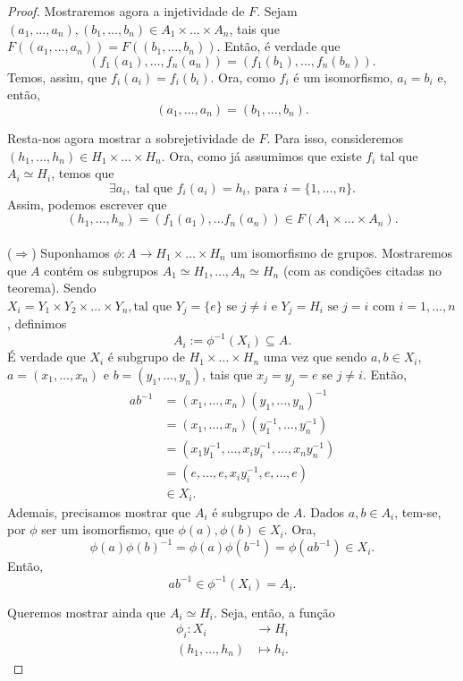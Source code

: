 \documentclass[11pt,openany]{book}
\begin{document}
\begin{proof}
        Mostraremos agora a injetividade de $F$. Sejam  $(a_1, \dots, a_n), (b_1, \dots, b_n) \in  A_1 \times \dots \times A_n$, tais que $F((a_1, \dots, a_n)) = F((b_1, \dots, b_n))$. Então, é verdade que
        \[(f_1(a_1), \dots, f_n(a_n)) = (f_1(b_1), \dots, f_n(b_n)).\]
        Temos, assim, que $f_i(a_i) = f_i(b_i)$. Ora, como $f_i$ é um isomorfismo, $a_i = b_i$ e, então,
        \[(a_1, \dots, a_n) = (b_1, \dots, b_n).\]

        Resta-nos agora mostrar a sobrejetividade de $F$. Para isso, consideremos $(h_1, \dots, h_n) \in H_1 \times \dots \times H_n$. Ora, como já assumimos que existe $f_i$ tal que $A_i \simeq H_i$, temos que
        \[\exists a_i, \ \text{tal que } f_i(a_i) = h_i, \ \text{para $i = \{1,\dots,n\}$}.\]
        Assim, podemos escrever que
        \[(h_1, \dots, h_n) = (f_1(a_1), \dots f_n(a_n)) \in F(A_1 \times \dots \times A_n).\]
        \\
        
        ($\Rightarrow$) Suponhamos $\phi: A \rightarrow H_1 \times \dots \times H_n$ um isomorfismo de grupos. Mostraremos que $A$ contém os subgrupos $A_1 \simeq H_1, \dots, A_n \simeq H_n$ (com as condições citadas no teorema). Sendo $X_i = Y_1 \times Y_2 \times \dots \times Y_n, \text{tal que $Y_j = \{e\}$ se $j \not= i$ e $Y_j = H_i$ se $j = i$}$ com $i = 1, ..., n$, definimos
        \[A_i := \phi^{-1}(X_i) \subseteq A.\]
        É verdade que $X_i$ é subgrupo de $H_1 \times \dots \times H_n$ uma vez que sendo $a, b \in X_i$, $a = (x_1, \dots, x_n)$ e $b = (y_1, \dots, y_n)$, tais que $x_j = y_j = e$ se $j \not= i$. Então,
        \begin{align*}
            ab^{-1} &= (x_1, \dots, x_n)(y_1, \dots, y_n)^{-1}\\
            &= (x_1, \dots, x_n)(y_1^{-1}, \dots, y_n^{-1})\\
            &= (x_1 y_1^{-1}, \dots, x_i y_i^{-1}, \dots, x_n y_n^{-1})\\
            &= (e, \dots, e, x_i y_i^{-1}, e, \dots, e)\\
            &\in X_i.
        \end{align*}
        Ademais, precisamos mostrar que $A_i$ é subgrupo de $A$. Dados $a, b \in A_i$, tem-se, por $\phi$ ser um isomorfismo, que $\phi(a), \phi(b) \in X_i$. Ora,
        \[\phi(a)\phi(b)^{-1} = \phi(a)\phi(b^{-1}) = \phi(ab^{-1}) \in X_i.\]
        Então,
        \[ab^{-1} \in \phi^{-1}(X_i) = A_i.\]

        Queremos mostrar ainda que $A_i \simeq H_i$. Seja, então, a função\\
        \begin{align*}
                \phi_i: X_i &\rightarrow H_i\\
                (h_1, \dots, h_n) &\mapsto h_i.
        \end{align*}
        

\end{proof}
\end{document}
